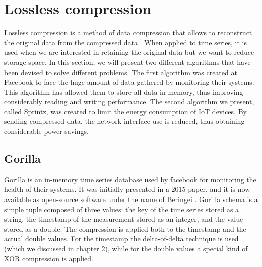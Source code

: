 \section{Lossless compression}
Lossless compression is a method of data compression that allows to reconstruct the original
data from the compressed data \cite{WikipediaContributors2019Data}. When applied to time series, it is used when we are
interested in retaining the original data but we want to reduce storage space. In this
section, we will present two different algorithms that have been devised to solve different
problems. The first algorithm was created at Facebook to face the huge amount of data
gathered by monitoring their systems. This algorithm has allowed them to store all data
in memory, thus improving considerably reading and writing performance.
The second algorithm we present, called Sprintz, was created to limit the energy consumption
of IoT devices. By sending compressed data, the network interface use is reduced, thus
obtaining considerable power savings.

\subsection{Gorilla}
Gorilla is an in-memory time series database used by facebook for monitoring the health of
their systems. It was initially presented in a 2015 paper, and it is now available as
open-source software under the name of Beringei \cite{beringei}. Gorilla schema is a simple tuple
composed of three values: the key of the time series stored as a string, the timestamp of the
measurement stored as an integer, and the value stored as a double. 
The compression is applied both to the timestamp and the actual double values. For the
timestamp the delta-of-delta technique is used (which we discussed in chapter 2), while for
the double values a special kind of XOR compression is applied.

